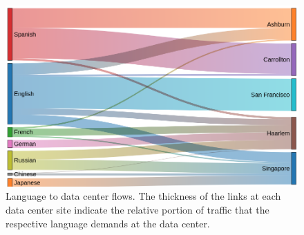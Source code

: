 \begin{figure}[h!]\centering
    \includegraphics[scale=0.4]{embodied_cost_model/images/sankey_dc_03.png}
    \caption[Language to Data Center Site Sankey Diagram]{Language to data center flows. The thickness of the links at each data center site indicate the relative portion of traffic that the respective language demands at the data center.}
    \label{land_dc_sankey}
    \end{figure}